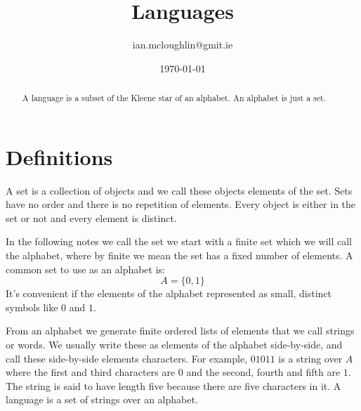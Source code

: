 

\title{Languages}
\author{ian.mcloughlin@gmit.ie}
\date{\today}



\maketitle

\begin{abstract}
  A language is a subset of the Kleene star of an alphabet.
  An alphabet is just a set.
\end{abstract}

\section{Definitions}
  A set is a collection of objects and we call these objects elements of the set.
  Sets have no order and there is no repetition of elements.
  Every object is either in the set or not and every element is distinct.

  In the following notes we call the set we start with a finite set which we will call the alphabet, where by finite we mean the set has a fixed number of elements.
  A common set to use as an alphabet is:
  \[ A = \{ 0, 1 \} \]
  It's convenient if the elements of the alphabet represented as small, distinct symbols like \( 0 \) and \( 1 \).

  From an alphabet we generate finite ordered lists of elements that we call strings or words.
  We usually write these as elements of the alphabet side-by-side, and call these side-by-side elements characters.
  For example, \( 01011 \) is a string over \( A \) where the first and third characters are \( 0 \) and the second, fourth and fifth are \( 1 \).
  The string is said to have length five because there are five characters in it.
  A language is a set of strings over an alphabet.
  
